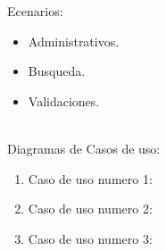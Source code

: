 \documentclass[12pt]{article}
\begin{document}
Ecenarios:
\begin{itemize}
\item  
Administrativos.
\item
Busqueda.
\item
Validaciones.\\\\
\end{itemize}

Diagramas de Casos de uso:
\begin{enumerate}
\item 
 Caso de uso numero 1:\\
\begin{center}
\end{center}
\item 
 Caso de uso numero 2:\\
\begin{center}
\end{center}
\item 
 Caso de uso numero 3:\\
\begin{center}
\end{center}
\end{enumerate}
\end{document}
